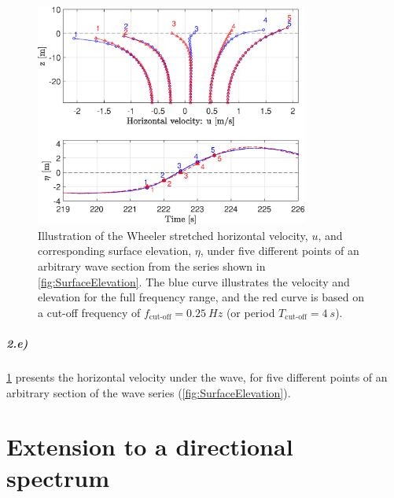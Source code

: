 \begin{figure}[htbp]
    \centering
    \includegraphics[width=0.8\textwidth]{Figures/Plots/etaHozvel.eps}
    \caption{Illustration of the Wheeler stretched horizontal velocity, $u$, and corresponding surface elevation, $\eta$, under five different points of an arbitrary wave section from the series shown in \cref{fig:SurfaceElevation}. The blue curve illustrates the velocity and elevation for the full frequency range, and the red curve is based on a cut-off frequency of $f_{\text{cut-off}}=\SI{0.25}{Hz}$ (or period $T_{\text{cut-off}}=\SI{4}{s}$). }
    \label{fig:etaHozvel}
\end{figure}

\paragraph{2.e)} \cref{fig:etaHozvel} presents the horizontal velocity under the wave, for five different points of an arbitrary section of the wave series (\cref{fig:SurfaceElevation}). 


\vspace{15mm}
{\let\clearpage\relax \chapter{Extension to a directional spectrum}}


